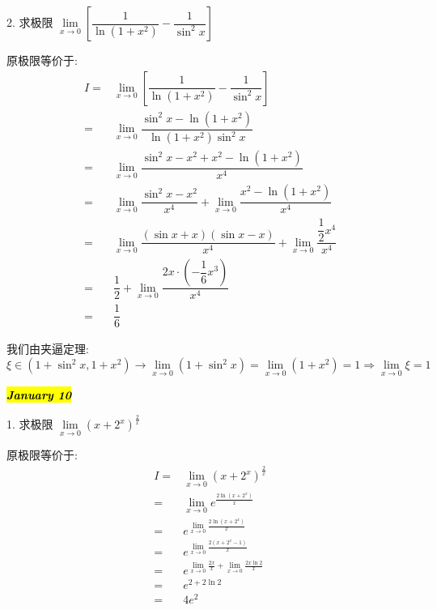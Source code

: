 2. 求极限 $\lim\limits_{x\to 0}\left[\dfrac{1}{\ln(1+x^{2})}-\dfrac{1}{\sin^{2}x}\right]$
\begin{solution}

	原极限等价于:
	\begin{align*}
		I = & \lim\limits_{x\to 0}\left[\dfrac{1}{\ln(1+x^{2})}-\dfrac{1}{\sin^{2}x}\right]\\
		  = & \lim\limits_{x\to 0}\dfrac{\sin^{2}x-\ln(1+x^{2})}{\ln(1+x^{2})\sin^{2}x}\\
		  = & \lim\limits_{x\to 0}\dfrac{\sin^{2}x-x^{2}+x^{2}-\ln(1+x^{2})}{x^{4}}\\
		  = & \lim\limits_{x\to 0}\dfrac{\sin^{2}x-x^{2}}{x^{4}}+\lim\limits_{x\to 0}\dfrac{x^{2}-\ln(1+x^{2})}{x^{4}}\\
		  = & \lim\limits_{x\to 0}\dfrac{(\sin x+x)(\sin x-x)}{x^{4}}+\lim\limits_{x\to 0}\dfrac{\dfrac{1}{2}x^{4}}{x^{4}}\\
		  = & \dfrac{1}{2}+\lim\limits_{x\to 0}\dfrac{2x\cdot(-\dfrac{1}{6}x^{3})}{x^{4}}\\ 
		  = & \dfrac{1}{6}
	\end{align*}
	
	我们由夹逼定理: $\xi\in(1+\sin^{2}x,1+x^{2})\to \lim\limits_{x\to 0}(1+\sin^{2}x) = \lim\limits_{x\to 0} (1+x^{2}) = 1\Rightarrow \lim\limits_{x\to 0}\xi = 1$
\end{solution}
\hl{\textbf{\textit{January 10}}}

1. 求极限 $\lim\limits_{x\to 0}\left(x+2^{x}\right)^{\frac{2}{x}}$
\begin{solution}
	
	原极限等价于:
	\begin{align*}
		I = & \lim\limits_{x\to 0}(x+2^{x})^{\frac{2}{x}}\\
		  = & \lim\limits_{x\to 0}e^{\frac{2\ln(x+2^{x})}{x}}\\
		  = & e^{\lim\limits_{x\to 0}\frac{2\ln(x+2^{x})}{x}}\\
		  = & e^{\lim\limits_{x\to 0}\frac{2(x+2^{x}-1)}{x}}\\
		  = & e^{\lim\limits_{x\to 0}\frac{2x}{x}+\lim\limits_{x\to 0}\frac{2x\ln 2}{x}}\\
		  = & e^{2+2\ln 2}\\
		  = & 4e^{2}
	\end{align*}
\end{solution}

